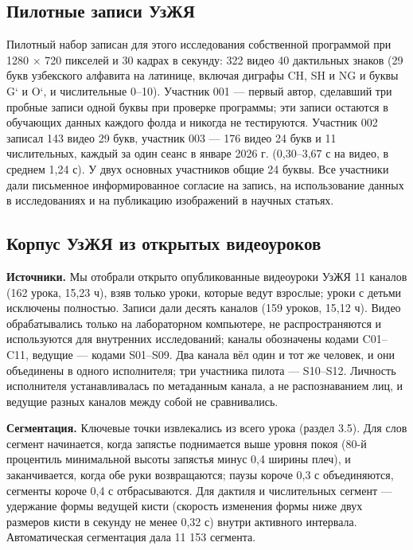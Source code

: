 \documentclass[a4paper,fleqn]{cas-dc}
\begin{document}
\hypertarget{ux43fux438ux43bux43eux442ux43dux44bux435-ux437ux430ux43fux438ux441ux438-ux443ux437ux436ux44f}{%
\subsection{Пилотные записи УзЖЯ}\label{ux43fux438ux43bux43eux442ux43dux44bux435-ux437ux430ux43fux438ux441ux438-ux443ux437ux436ux44f}}

Пилотный набор записан для этого исследования собственной программой при 1280 $\times$ 720 пикселей и 30 кадрах в секунду: 322 видео 40 дактильных знаков (29 букв узбекского алфавита на латинице, включая диграфы CH, SH и NG и буквы G‘ и O‘, и числительные 0--10). Участник 001 --- первый автор, сделавший три пробные записи одной буквы при проверке программы; эти записи остаются в обучающих данных каждого фолда и никогда не тестируются. Участник 002 записал 143 видео 29 букв, участник 003 --- 176 видео 24 букв и 11 числительных, каждый за один сеанс в январе 2026 г. (0,30--3,67 с на видео, в среднем 1,24 с). У двух основных участников общие 24 буквы. Все участники дали письменное информированное согласие на запись, на использование данных в исследованиях и на публикацию изображений в научных статьях.

\hypertarget{ux43aux43eux440ux43fux443ux441-ux443ux437ux436ux44f-ux438ux437-ux43eux442ux43aux440ux44bux442ux44bux445-ux432ux438ux434ux435ux43eux443ux440ux43eux43aux43eux432}{%
\subsection{Корпус УзЖЯ из открытых видеоуроков}\label{ux43aux43eux440ux43fux443ux441-ux443ux437ux436ux44f-ux438ux437-ux43eux442ux43aux440ux44bux442ux44bux445-ux432ux438ux434ux435ux43eux443ux440ux43eux43aux43eux432}}

\textbf{Источники.} Мы отобрали открыто опубликованные видеоуроки УзЖЯ 11 каналов (162 урока, 15,23 ч), взяв только уроки, которые ведут взрослые; уроки с детьми исключены полностью. Записи дали десять каналов (159 уроков, 15,12 ч). Видео обрабатывались только на лабораторном компьютере, не распространяются и используются для внутренних исследований; каналы обозначены кодами C01--C11, ведущие --- кодами S01--S09. Два канала вёл один и тот же человек, и они объединены в одного исполнителя; три участника пилота --- S10--S12. Личность исполнителя устанавливалась по метаданным канала, а не распознаванием лиц, и ведущие разных каналов между собой не сравнивались.

\textbf{Сегментация.} Ключевые точки извлекались из всего урока (раздел 3.5). Для слов сегмент начинается, когда запястье поднимается выше уровня покоя (80-й процентиль минимальной высоты запястья минус 0,4 ширины плеч), и заканчивается, когда обе руки возвращаются; паузы короче 0,3 с объединяются, сегменты короче 0,4 с отбрасываются. Для дактиля и числительных сегмент --- удержание формы ведущей кисти (скорость изменения формы ниже двух размеров кисти в секунду не менее 0,32 с) внутри активного интервала. Автоматическая сегментация дала 11 153 сегмента.
\end{document}
